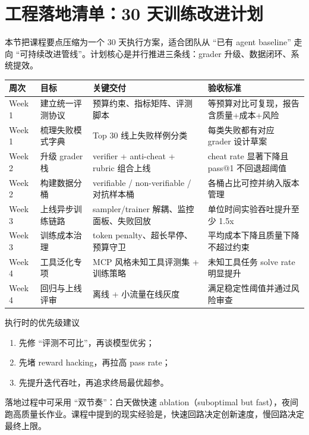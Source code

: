 \section{工程落地清单：30 天训练改进计划}

本节把课程要点压缩为一个 30 天执行方案，适合团队从 ``已有 agent baseline'' 走向 ``可持续改进管线''。计划核心是并行推进三条线：grader 升级、数据闭环、系统提效。

\begin{longtable}{p{1.3cm}p{3.0cm}p{2.7cm}p{3.5cm}}
\toprule
\textbf{周次} & \textbf{目标} & \textbf{关键交付} & \textbf{验收标准} \\
\midrule
Week 1 & 建立统一评测协议 & 预算约束、指标矩阵、评测脚本 & 等预算对比可复现，报告含质量+成本+风险 \\
Week 1 & 梳理失败模式字典 & Top 30 线上失败样例分类 & 每类失败都有对应 grader 设计草案 \\
Week 2 & 升级 grader 栈 & verifier + anti-cheat + rubric 组合上线 & cheat rate 显著下降且 pass@1 不回退超阈值 \\
Week 2 & 构建数据分桶 & verifiable / non-verifiable / 对抗样本桶 & 各桶占比可控并纳入版本管理 \\
Week 3 & 上线异步训练链路 & sampler/trainer 解耦、监控面板、失败回放 & 单位时间实验吞吐提升至少 1.5x \\
Week 3 & 训练成本治理 & token penalty、超长早停、预算守卫 & 平均成本下降且质量下降不超过约束 \\
Week 4 & 工具泛化专项 & MCP 风格未知工具评测集 + 训练策略 & 未知工具任务 solve rate 明显提升 \\
Week 4 & 回归与上线评审 & 离线 + 小流量在线灰度 & 满足稳定性阈值并通过风险审查 \\
\bottomrule
\end{longtable}

\begin{importantbox}{执行时的优先级建议}
\begin{enumerate}
    \item 先修 ``评测不可比''，再谈模型优劣；
    \item 先堵 reward hacking，再拉高 pass rate；
    \item 先提升迭代吞吐，再追求终局最优超参。
\end{enumerate}
\end{importantbox}

落地过程中可采用 ``双节奏''：白天做快速 ablation（suboptimal but fast），夜间跑高质量长作业。课程中提到的现实经验是，快速回路决定创新速度，慢回路决定最终上限。

